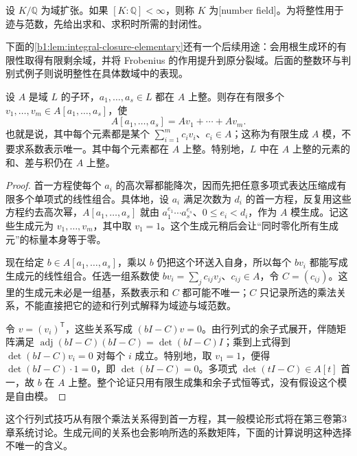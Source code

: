 \ProseParagraphBreak
设 \(K/\mathbb Q\) 为域扩张。如果 \([K:\mathbb Q]<\infty\)，则称 \(K\) 为[number field]。为将整性用于迹与范数，先给出求和、求积时所需的封闭性。

\ProseParagraphBreak
下面的\cref{b1:lem:integral-closure-elementary}还有一个后续用途：会用根生成环的有限性取得有限剩余域，并将 Frobenius 的作用提升到原分裂域。后面的整数环与判别式例子则说明整性在具体数域中的表现。
\begin{lemma}\label{b1:lem:integral-closure-elementary}
	设 \(A\) 是域 \(L\) 的子环，\(a_1,\ldots,a_s\in L\) 都在 \(A\) 上整。则存在有限多个 \(v_1,\ldots,v_m\in A[a_1,\ldots,a_s]\)，使
	\[
		A[a_1,\ldots,a_s]=Av_1+\cdots+Av_m.
	\]
	也就是说，其中每个元素都是某个 \(\sum_{i=1}^m c_iv_i\)、\(c_i\in A\)；这称为有限生成 \(A\) 模，不要求系数表示唯一。其中每个元素都在 \(A\) 上整。特别地，\(L\) 中在 \(A\) 上整的元素的和、差与积仍在 \(A\) 上整。
\end{lemma}
\begin{proof}
	首一方程使每个 \(a_i\) 的高次幂都能降次，因而先把任意多项式表达压缩成有限多个单项式的线性组合。具体地，设 \(a_i\) 满足次数为 \(d_i\) 的首一方程，反复用这些方程约去高次幂，\(A[a_1,\ldots,a_s]\) 就由 \(a_1^{e_1}\cdots a_s^{e_s}\)、\(0\leq e_i<d_i\)，作为 \(A\) 模生成。记这些生成元为 \(v_1,\ldots,v_m\)，其中取 \(v_1=1\)。这个生成元稍后会让“同时零化所有生成元”的标量本身等于零。

	现在给定 \(b\in A[a_1,\ldots,a_s]\)，乘以 \(b\) 仍把这个环送入自身，所以每个 \(bv_i\) 都能写成生成元的线性组合。任选一组系数使 \(bv_i=\sum_j c_{ij}v_j\)、\(c_{ij}\in A\)，令 \(C=(c_{ij})\)。这里的生成元未必是一组基，系数表示和 \(C\) 都可能不唯一；\(C\) 只记录所选的乘法关系，不能直接把它的迹和行列式解释为域迹与域范数。

	令 \(v=(v_i)^{\mathsf T}\)，这些关系写成 \((bI-C)v=0\)。由行列式的余子式展开，伴随矩阵满足 \(\operatorname{adj}(bI-C)(bI-C)=\det(bI-C)I\)；乘到上式得到 \(\det(bI-C)v_i=0\) 对每个 \(i\) 成立。特别地，取 \(v_1=1\)，便得 \(\det(bI-C)\cdot1=0\)，即 \(\det(bI-C)=0\)。多项式 \(\det(tI-C)\in A[t]\) 首一，故 \(b\) 在 \(A\) 上整。整个论证只用有限生成集和余子式恒等式，没有假设这个模是自由模。
\end{proof}
这个行列式技巧从有限个乘法关系得到首一方程，其一般模论形式将在第三卷第3章系统讨论。生成元间的关系也会影响所选的系数矩阵，下面的计算说明这种选择不唯一的含义。


